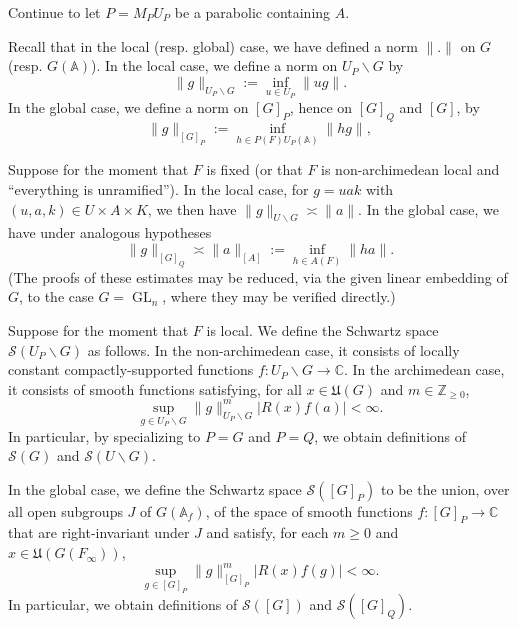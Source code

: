 \documentclass[reqno]{amsart}
\DeclareMathOperator{\GL}{GL}
\theoremstyle{plain} \newtheorem{theorem} {Theorem}
\theoremstyle{definition} \newtheorem{definition} [theorem] {Definition}
\theoremstyle{itplain} %
\numberwithin{equation}{section}
\numberwithin{theorem}{section}
\renewcommand{\geq}{\geqslant}
\begin{document}
Continue to let $P = M_P U_P$ be a parabolic containing $A$.

Recall that in the local (resp. global) case, we have defined a norm $\|.\|$ on $G$ (resp. $G(\mathbb{A})$).  In the local case, we define a norm on $U_P \backslash G$ by
\begin{equation*}
\|g\|_{U_P \backslash G} := \inf_{u \in U_P} \|u g\|.
\end{equation*}
In the global case, we define a norm on $[G]_P$, hence on $[G]_Q$ and $[G]$, by
\begin{equation}\label{eq:g_g-:=-inf_gamma}
  \|g\|_{[G]_P} := \inf_{h \in P(F) U_P(\mathbb{A})} \|h g\|,
\end{equation}

Suppose for the moment that $F$ is fixed (or that $F$ is non-archimedean local and ``everything is unramified'').  In the local case, for $g = u a k$ with $(u,a,k) \in U \times A \times K$, we then have $\|g\|_{U \backslash G} \asymp \|a\|$.  In the global case, we have under analogous hypotheses
\begin{equation*}
\|g\| _{[G]_Q} \asymp \|a\|_{[A]} := \inf_{h \in A(F)} \|h a\|.
\end{equation*}
(The proofs of these estimates may be reduced, via the given linear embedding of $G$, to the case $G = \GL_n$, where they may be verified directly.)

Suppose for the moment that $F$ is local.  We define the Schwartz space $\mathcal{S}(U_P \backslash G)$ as follows.  In the non-archimedean case, it consists of locally constant compactly-supported functions $f : U_P \backslash G \rightarrow \mathbb{C}$.  In the archimedean case, it consists of smooth functions satisfying, for all $x \in \mathfrak{U}(G)$ and $m \in \mathbb{Z}_{\geq 0}$,
\begin{equation*}
  \sup_{g \in U_P \backslash G} \|g\|_{U_P \backslash G}^m | R(x) f(a) | < \infty.
\end{equation*}
In particular, by specializing to $P = G$ and $P = Q$, we obtain definitions of $\mathcal{S}(G)$ and $\mathcal{S}(U \backslash G)$. 

In the global case, we define the Schwartz space $\mathcal{S}([G]_P)$ to be the union, over all open subgroups $J$ of $G(\mathbb{A}_f)$, of the space of smooth functions $f : [G]_P \rightarrow \mathbb{C}$ that are right-invariant under $J$ and satisfy, for each $m \geq 0$ and $x \in \mathfrak{U}(G(F_\infty))$,
\begin{equation*}
\sup_{g \in [G]_P} \|g\|_{[G]_P}^m |R(x) f(g)| < \infty.
\end{equation*}
In particular, we obtain definitions of $\mathcal{S}([G])$ and $\mathcal{S}([G]_Q)$.  
\end{document}
